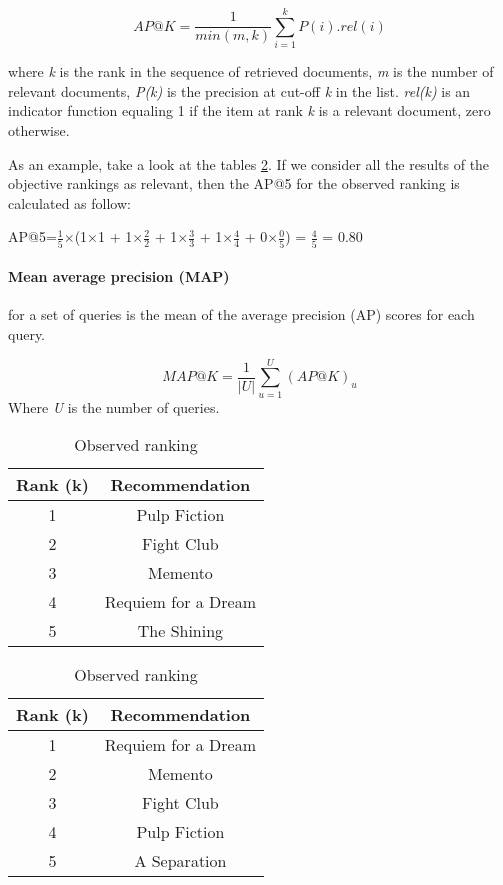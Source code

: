 \begin{equation}
	AP@K = \frac{1}{min(m,k)}\sum_{i=1}^{k}P(i).rel(i)
	\label{eq:ap@k}
\end{equation}

where \emph{k} is the rank in the sequence of retrieved documents, \emph{m} is the number of relevant documents, \emph{P(k)} is the precision at cut-off \emph{k} in the list. \emph{rel(k)}
is an indicator function equaling 1 if the item at rank \emph{k} is a relevant document, zero otherwise.

As an example, take a look at the tables \ref{tab:apk-example}. If we consider all the results of the objective rankings as relevant, then the AP@5 for the observed ranking is calculated as follow:

AP@5=$\frac{1}{5}$$\times$(1$\times$1 + 1$\times$$\frac{2}{2}$ + 1$\times$$\frac{3}{3}$ + 1$\times$$\frac{4}{4}$ + 0$\times$$\frac{0}{5}$) = $\frac{4}{5}$ = 0.80

\paragraph*{Mean average precision (MAP)} for a set of queries is the mean of the average precision (AP) scores for each query.

\begin{equation}
	MAP@K = \frac{1}{|U|}\sum_{u=1}^{U}(AP@K)_{u}
	\label{eq:map@k}
\end{equation}
Where \emph{U} is the number of queries.

\begin{table}[!ht]
	\caption{Comparing results of objective and observed ranking}
	\label{tab:apk-example}
	\begin{subtable}{.5\linewidth}
		\caption{Objective ranking}
		\centering
		\begin{tabular}{c|c}
			\textbf{Rank (k)}&\textbf{Recommendation} \\
			\hline
			1 & Pulp Fiction \\
			2 & Fight Club \\
			3 & Memento \\
			4 & Requiem for a Dream \\
			5 & The Shining \\
		\end{tabular}
	\end{subtable}%
	\begin{subtable}{.5\linewidth}
		\caption{Observed ranking}
		\centering
		\begin{tabular}{c|c}
			\textbf{Rank (k)}&\textbf{Recommendation} \\
			\hline
			1 & Requiem for a Dream \\
			2 & Memento \\
			3 & Fight Club \\
			4 & Pulp Fiction \\
			5 & A Separation  \\
		\end{tabular}
	\end{subtable}%
\end{table}

